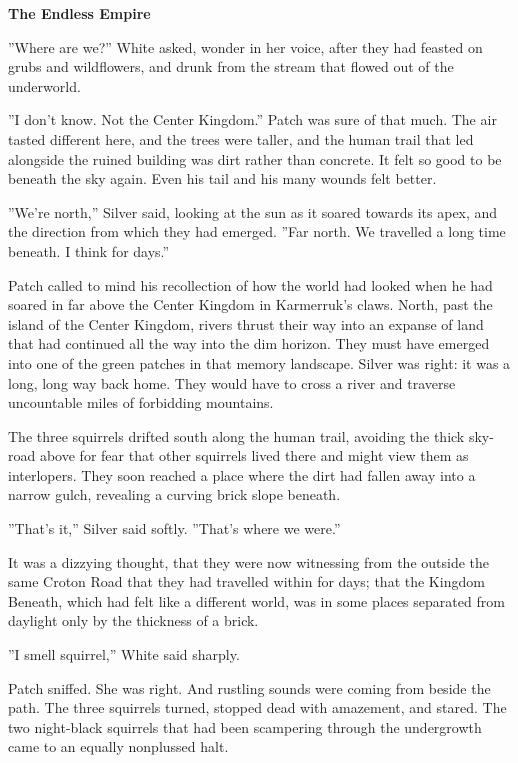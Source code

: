 \documentclass[11pt]{article}
\begin{document}
{\bf The Endless Empire\par
}\par
 ''Where are we?'' White asked, wonder in her voice, after they had feasted on grubs and wildflowers, and drunk from the stream that flowed out of the underworld.\par
 ''I don't know. Not the Center Kingdom.'' Patch was sure of that much. The air tasted different here, and the trees were taller, and the human trail that led alongside the ruined building was dirt rather than concrete. It felt so good to be beneath the sky again. Even his tail and his many wounds felt better.\par
 ''We're north,'' Silver said, looking at the sun as it soared towards its apex, and the direction from which they had emerged. ''Far north. We travelled a long time beneath. I think for days.''\par
 Patch called to mind his recollection of how the world had looked when he had soared in far above the Center Kingdom in Karmerruk's claws. North, past the island of the Center Kingdom, rivers thrust their way into an expanse of land that had continued all the way into the dim horizon. They must have emerged into one of the green patches in that memory landscape. Silver was right: it was a long, long way back home. They would have to cross a river and traverse uncountable miles of forbidding mountains.\par
 The three squirrels drifted south along the human trail, avoiding the thick sky-road above for fear that other squirrels lived there and might view them as interlopers. They soon reached a place where the dirt had fallen away into a narrow gulch, revealing a curving brick slope beneath.\par
 ''That's it,'' Silver said softly. ''That's where we were.''\par
 It was a dizzying thought, that they were now witnessing from the outside the same Croton Road that they had travelled within for days; that the Kingdom Beneath, which had felt like a different world, was in some places separated from daylight only by the thickness of a brick.\par
 ''I smell squirrel,'' White said sharply.\par
 Patch sniffed. She was right. And rustling sounds were coming from beside the path. The three squirrels turned, stopped dead with amazement, and stared. The two night-black squirrels that had been scampering through the undergrowth came to an equally nonplussed halt.\par
\end{document}
